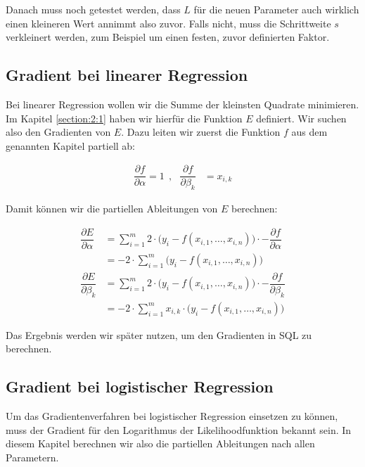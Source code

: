 Danach muss noch getestet werden, dass $L$ für die neuen Parameter auch wirklich einen kleineren Wert annimmt also zuvor. Falls nicht, muss die Schrittweite $s$ verkleinert werden, zum Beispiel um einen festen, zuvor definierten Faktor.

\subsection{Gradient bei linearer Regression}
\label{subsection:2:3:1}

Bei linearer Regression wollen wir die Summe der kleinsten Quadrate minimieren. Im Kapitel \ref{section:2:1} haben wir hierfür die Funktion $E$ definiert. Wir suchen also den Gradienten von $E$. Dazu leiten wir zuerst die Funktion $f$ aus dem genannten Kapitel partiell ab:

\begin{align*}
    \dfrac{\partial f}{\partial \alpha} = 1 ~~,~~~ \dfrac{\partial f}{\partial \beta_k} &= x_{i, k}
\end{align*}

Damit können wir die partiellen Ableitungen von $E$ berechnen:

\begin{align*}
    \dfrac{\partial E}{\partial \alpha} &= \sum_{i=1}^m 2 \cdot \big( y_i - f(x_{i, 1}, \dots, x_{i, n}) \big) \cdot - \dfrac{\partial f}{\partial \alpha} \\
    &= -2 \cdot \sum_{i=1}^m \big( y_i - f(x_{i, 1}, \dots, x_{i, n}) \big) \\
    \dfrac{\partial E}{\partial \beta_k} &= \sum_{i=1}^m 2 \cdot \big( y_i - f(x_{i, 1}, \dots, x_{i, n}) \big) \cdot - \dfrac{\partial f}{\partial \beta_k} \\
    &= -2 \cdot \sum_{i=1}^m x_{i, k} \cdot \big( y_i - f(x_{i, 1}, \dots, x_{i, n}) \big)
\end{align*}

Das Ergebnis werden wir später nutzen, um den Gradienten in SQL zu berechnen.

\subsection{Gradient bei logistischer Regression}
\label{subsection:2:3:2}

Um das Gradientenverfahren bei logistischer Regression einsetzen zu können, muss der Gradient für den Logarithmus der Likelihoodfunktion bekannt sein. In diesem Kapitel berechnen wir also die partiellen Ableitungen nach allen Parametern.

